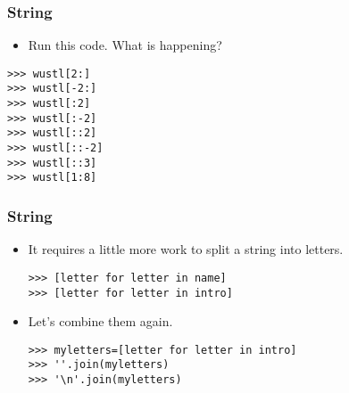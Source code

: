 \documentclass[xcolor=x11names,compress]{beamer}
\renewcommand{\(}{\begin{columns}}
\renewcommand{\)}{\end{columns}}
\newcommand{\<}[1]{\begin{column}{#1}}
\renewcommand{\>}{\end{column}}
\begin{document}
\begin{frame}[fragile]
\frametitle{String}
\begin{itemize}
\item Run this code. What is happening?\pause
\end{itemize}
\begin{verbatim}
>>> wustl[2:]
>>> wustl[-2:]
>>> wustl[:2]
>>> wustl[:-2]
>>> wustl[::2]
>>> wustl[::-2]
>>> wustl[::3]
>>> wustl[1:8]
\end{verbatim}
\end{frame}

\begin{frame}[fragile]
  \frametitle{String}
  \begin{itemize}
  	\item It requires a little more work to split a string into letters. \pause
	\begin{verbatim}
>>> [letter for letter in name]
>>> [letter for letter in intro]
\end{verbatim} \pause
	\item Let's combine them again. \pause
	\begin{verbatim}
>>> myletters=[letter for letter in intro]
>>> ''.join(myletters)
>>> '\n'.join(myletters)
\end{verbatim}
  \end{itemize}
\end{frame}

\end{document}

